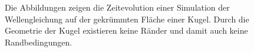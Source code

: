 \documentclass[crop=false]{standalone}
\begin{document}
\begin{figure}
\begin{subfigure}[b]{0.24\textwidth}
        \caption{}
      \end{subfigure}
      \caption[Wellensimulation auf einer Kugel]{%
        Die Abbildungen zeigen die Zeitevolution einer Simulation der Wellengleichung auf der gekrümmten Fläche einer Kugel.
        Durch die Geometrie der Kugel existieren keine Ränder und damit auch keine Randbedingungen.
      }
      \label{fig:sphere-wave}
    \end{figure}

\end{document}
